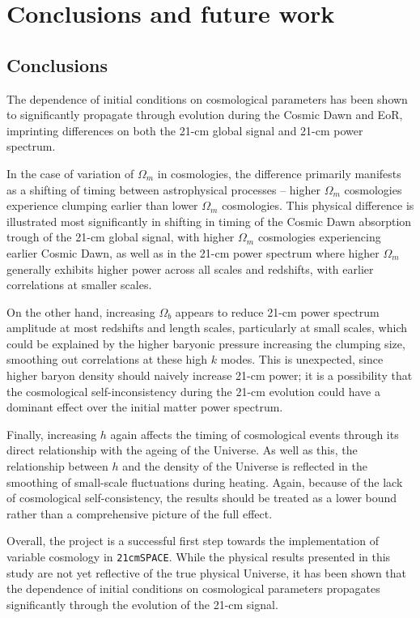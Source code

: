 \documentclass[floats,floatfix,showpacs,amssymb,prd,superscriptaddress,nofootinbib]{revtex4-2} %
\newcommand{\code}{\texttt}
\begin{document}
\newpage
\section{Conclusions and future work}
\subsection{Conclusions}
The dependence of initial conditions on cosmological parameters has been shown to significantly propagate through evolution during the Cosmic Dawn and EoR, imprinting differences on both the 21-cm global signal and 21-cm power spectrum. 

In the case of variation of $\Omega_m$ in cosmologies, the difference primarily manifests as a shifting of timing between astrophysical processes -- higher $\Omega_m$ cosmologies experience clumping earlier than lower $\Omega_m$ cosmologies. This physical difference is illustrated most significantly in shifting in timing of the Cosmic Dawn absorption trough of the 21-cm global signal, with higher $\Omega_m$ cosmologies experiencing earlier Cosmic Dawn, as well as in the 21-cm power spectrum where higher $\Omega_m$ generally exhibits higher power across all scales and redshifts, with earlier correlations at smaller scales.

On the other hand, increasing $\Omega_b$ appears to reduce 21-cm power spectrum amplitude at most redshifts and length scales, particularly at small scales, which could be explained by the higher baryonic pressure increasing the clumping size, smoothing out correlations at these high $k$ modes. This is unexpected, since higher baryon density should naively increase 21-cm power; it is a possibility that the cosmological self-inconsistency during the 21-cm evolution could have a dominant effect over the initial matter power spectrum.

Finally, increasing $h$ again affects the timing of cosmological events through its direct relationship with the ageing of the Universe. As well as this, the relationship between $h$ and the density of the Universe is reflected in the smoothing of small-scale fluctuations during heating. Again, because of the lack of cosmological self-consistency, the results should be treated as a lower bound rather than a comprehensive picture of the full effect.

Overall, the project is a successful first step towards the implementation of variable cosmology in \code{21cmSPACE}. While the physical results presented in this study are not yet reflective of the true physical Universe, it has been shown that the dependence of initial conditions on cosmological parameters propagates significantly through the evolution of the 21-cm signal. 
\end{document}
